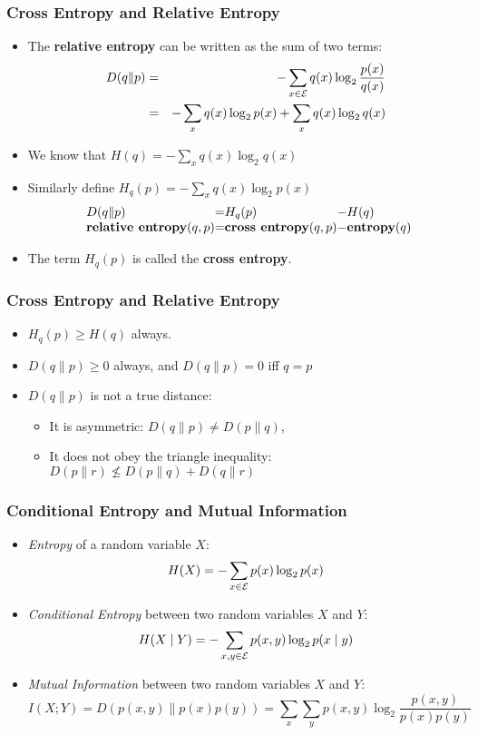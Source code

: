 \documentclass[handout]{beamer}
\begin{document}
\begin{frame}
\frametitle{Cross Entropy and Relative Entropy}
\begin{itemize}[<+->]
\item The {\bf relative entropy} can be written as the sum of two terms:
\begin{eqnarray*}
D(q \| p) & = & - \sum_{x \in {\cal E}} q(x) \log_2 \frac{p(x)}{q(x)} \\
& = & - \sum_{x} q(x) \log_2 p(x) + \sum_{x} q(x) \log_2 q(x) 
\end{eqnarray*}
\item We know that $H(q) = - \sum_{x} q(x) \log_2 q(x)$
\item Similarly define $H_{q}(p) = - \sum_{x} q(x) \log_2 p(x)$
\[
\begin{array}{l@{}c@{}l@{}c@{}l@{}}
D(q \| p) & = & H_{q}(p) & - & H(q) \\
\textbf{relative entropy}(q, p) & = & \textbf{cross entropy}(q, p) & - & \textbf{entropy}(q) 
\end{array}
\]
\item The term $H_{q}(p)$ is called the {\bf cross entropy}.
\end{itemize}

\end{frame}

\begin{frame}
\frametitle{Cross Entropy and Relative Entropy}
\begin{itemize}[<+->]
\item $H_{q}(p) \geq H(q)$ always.
\item $D(q \| p) \geq 0$ always, and $D(q \| p) = 0$ iff $q = p$
\item $D(q \| p)$ is not a true distance: 
  \begin{itemize}
  \item It is asymmetric: $D(q \| p) \neq D(p \| q)$, 
  \item It does not obey the triangle inequality: $D(p \| r) \nleq D(p \| q) + D(q \| r)$
  \end{itemize}
\end{itemize}

\end{frame}

\begin{frame}
\frametitle{Conditional Entropy and Mutual Information}
\begin{itemize}[<+->]
\item {\it Entropy} of a random variable $X$:
\[ H(X) = - \sum_{x \in {\cal E}} p(x) \log_2 p(x) \]
\item {\it Conditional Entropy} between two random variables $X$ and $Y$:
\[ H(X \mid Y) = - \sum_{x,y \in {\cal E}} p(x,y) \log_2 p(x
\mid y) \]
\item {\it Mutual Information} between two random variables $X$ and $Y$:
\[ I(X;Y) = D(p(x,y) \| p(x)p(y)) = \sum_x \sum_y p(x,y) \log_2
\frac{p(x,y)}{p(x)p(y)} \]
\end{itemize}

\end{frame}


\end{document}
